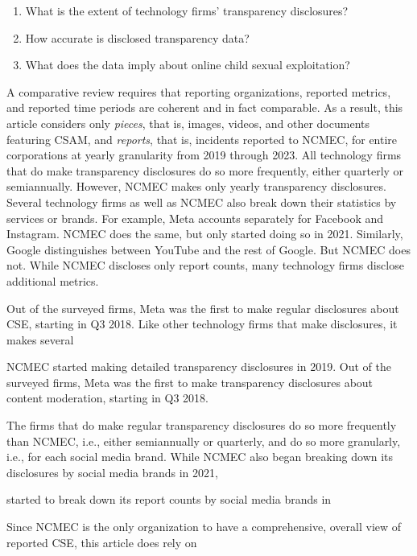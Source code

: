 \documentclass[nonacm,screen]{acmart}
\begin{document}
\begin{enumerate}
\item What is the extent of technology firms' transparency disclosures?
\item How accurate is disclosed transparency data?
\item What does the data imply about online child sexual exploitation?
\end{enumerate}


A comparative review requires that reporting organizations, reported metrics,
and reported time periods are coherent and in fact comparable. As a result, this
article considers only \emph{pieces}, that is, images, videos, and other
documents featuring CSAM, and \emph{reports}, that is, incidents reported to
NCMEC, for entire corporations at yearly granularity from 2019 through 2023. All
technology firms that do make transparency disclosures do so more frequently,
either quarterly or semiannually. However, NCMEC makes only yearly transparency
disclosures. Several technology firms as well as NCMEC also break down their
statistics by services or brands. For example, Meta accounts separately for
Facebook and Instagram. NCMEC does the same, but only started doing so in 2021.
Similarly, Google distinguishes between YouTube and the rest of Google. But
NCMEC does not. While NCMEC discloses only report counts, many technology firms
disclose additional metrics.



Out of the surveyed firms, Meta was the first to make regular disclosures
about CSE, starting in Q3 2018. Like other technology firms that make
disclosures, it makes several



NCMEC started making detailed transparency disclosures in 2019. Out of the
surveyed firms, Meta was the first to make transparency disclosures about
content moderation, starting in Q3 2018.



The firms that do make regular transparency disclosures do so more frequently
than NCMEC, i.e., either semiannually or quarterly, and do so more granularly,
i.e., for each social media brand. While NCMEC also began breaking down its
disclosures by social media brands in 2021,

started to break down its
report counts by social media brands in


Since NCMEC is the only organization to have a comprehensive, overall view of
reported CSE, this article does rely on
\end{document}
